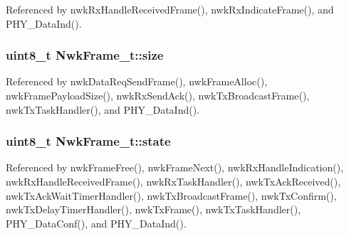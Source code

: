 Referenced by nwk\-Rx\-Handle\-Received\-Frame(), nwk\-Rx\-Indicate\-Frame(), and P\-H\-Y\-\_\-\-Data\-Ind().

\hypertarget{struct_nwk_frame__t_a42934dd5ff3a529ffb264402944f77e8}{
\subsubsection[{size}]{\setlength{\rightskip}{0pt plus 5cm}uint8\-\_\-t Nwk\-Frame\-\_\-t\-::size}}\label{struct_nwk_frame__t_a42934dd5ff3a529ffb264402944f77e8}


Referenced by nwk\-Data\-Req\-Send\-Frame(), nwk\-Frame\-Alloc(), nwk\-Frame\-Payload\-Size(), nwk\-Rx\-Send\-Ack(), nwk\-Tx\-Broadcast\-Frame(), nwk\-Tx\-Task\-Handler(), and P\-H\-Y\-\_\-\-Data\-Ind().

\hypertarget{struct_nwk_frame__t_a5fbf3e581463732d26ea7b242c666109}{
\subsubsection[{state}]{\setlength{\rightskip}{0pt plus 5cm}uint8\-\_\-t Nwk\-Frame\-\_\-t\-::state}}\label{struct_nwk_frame__t_a5fbf3e581463732d26ea7b242c666109}


Referenced by nwk\-Frame\-Free(), nwk\-Frame\-Next(), nwk\-Rx\-Handle\-Indication(), nwk\-Rx\-Handle\-Received\-Frame(), nwk\-Rx\-Task\-Handler(), nwk\-Tx\-Ack\-Received(), nwk\-Tx\-Ack\-Wait\-Timer\-Handler(), nwk\-Tx\-Broadcast\-Frame(), nwk\-Tx\-Confirm(), nwk\-Tx\-Delay\-Timer\-Handler(), nwk\-Tx\-Frame(), nwk\-Tx\-Task\-Handler(), P\-H\-Y\-\_\-\-Data\-Conf(), and P\-H\-Y\-\_\-\-Data\-Ind().

